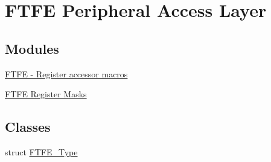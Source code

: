 \hypertarget{group__FTFE__Peripheral__Access__Layer}{}\section{F\+T\+FE Peripheral Access Layer}
\label{group__FTFE__Peripheral__Access__Layer}
\subsection*{Modules}
\begin{DoxyCompactItemize}
\item 
\hyperlink{group__FTFE__Register__Accessor__Macros}{F\+T\+F\+E -\/ Register accessor macros}
\item 
\hyperlink{group__FTFE__Register__Masks}{F\+T\+F\+E Register Masks}
\end{DoxyCompactItemize}
\subsection*{Classes}
\begin{DoxyCompactItemize}
\item 
struct \hyperlink{structFTFE__Type}{F\+T\+F\+E\+\_\+\+Type}
\end{DoxyCompactItemize}
